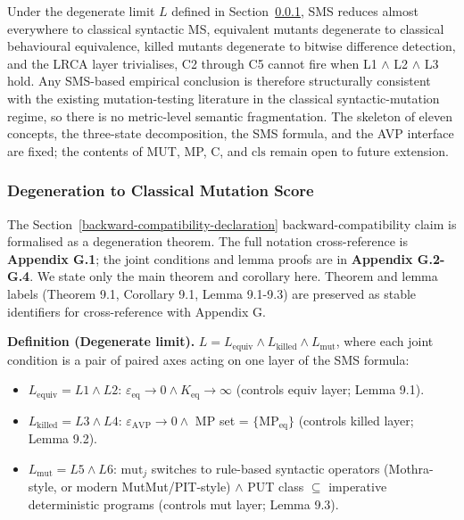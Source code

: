 \documentclass[12pt]{article}
\providecommand{\tightlist}{\setlength{\itemsep}{0pt}\setlength{\parskip}{0pt}}
\begin{document}
Under the degenerate limit $L$ defined in Section~\ref{sms-ms-degeneration-formal-statement}, SMS reduces
almost everywhere to classical syntactic MS, equivalent mutants
degenerate to classical behavioural equivalence, killed mutants
degenerate to bitwise difference detection, and the LRCA layer
trivialises, C2 through C5 cannot fire when L1 $\wedge$ L2 $\wedge$ L3 hold. Any
SMS-based empirical conclusion is therefore structurally consistent with
the existing mutation-testing literature in the classical
syntactic-mutation regime, so there is no metric-level semantic
fragmentation. The skeleton of eleven concepts, the three-state
decomposition, the SMS formula, and the AVP interface are fixed; the
contents of MUT, MP, C, and $\mathrm{cls}$ remain open to future
extension.

\subsubsection{Degeneration to Classical Mutation Score}\label{sms-ms-degeneration-formal-statement}

The Section~\ref{backward-compatibility-declaration} backward-compatibility claim is formalised as a degeneration
theorem. The full notation cross-reference is \textbf{Appendix G.1}; the
joint conditions and lemma proofs are in \textbf{Appendix G.2-G.4}. We
state only the main theorem and corollary here. Theorem and lemma labels
(Theorem 9.1, Corollary 9.1, Lemma 9.1-9.3) are preserved as stable
identifiers for cross-reference with Appendix G.

\textbf{Definition (Degenerate limit).}
$L = L_{\mathrm{equiv}} \wedge L_{\mathrm{killed}} \wedge L_{\mathrm{mut}}$, where each joint
condition is a pair of paired axes acting on one layer of the SMS
formula:

\begin{itemize}
\tightlist
\item
  $L_{\mathrm{equiv}} = L1 \wedge L2$: $\varepsilon_{\mathrm{eq}} \to 0 \wedge K_{\mathrm{eq}} \to \infty$ (controls equiv
  layer; Lemma 9.1).
\item
  $L_{\mathrm{killed}} = L3 \wedge L4$: $\varepsilon_{\mathrm{AVP}} \to 0 \wedge$ MP set = $\{\mathrm{MP}_{\mathrm{eq}}\}$
  (controls killed layer; Lemma 9.2).
\item
  $L_{\mathrm{mut}} = L5 \wedge L6$: $\mathrm{mut}_j$ switches to rule-based syntactic
  operators (Mothra-style, or modern MutMut/PIT-style) $\wedge$ PUT class $\subseteq$ imperative deterministic
  programs (controls mut layer; Lemma 9.3).
\end{itemize}
\end{document}
